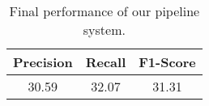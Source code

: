 \begin{table}[ht]
\centering
\begin{tabular}{|c|c|c|}
\hline

\bf Precision & \bf Recall & \bf F1-Score \\ \hline
    30.59     &     32.07  &     31.31    \\ \hline

\end{tabular}
\caption{\label{t:final-results} Final performance of our pipeline system. }
\end{table}
